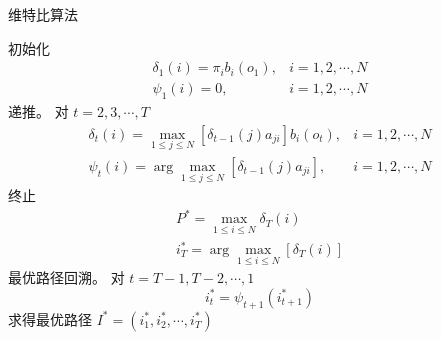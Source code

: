 \begin{algorithm}
\caption{维特比算法}


    初始化
$$
\begin{array}{cc}
\delta_{1}(i)=\pi_{i} b_{i}\left(o_{1}\right), & i=1,2, \cdots, N \\
\psi_{1}(i)=0, & i=1,2, \cdots, N
\end{array}
$$\;
递推。 对 $ t=2,3, \cdots, T $
$$
\begin{array}{ll}
\delta_{t}(i)=\max _{1 \leqslant j \leqslant N}\left[\delta_{t-1}(j) a_{j i}\right] b_{i}\left(o_{t}\right), & i=1,2, \cdots, N \\
\psi_{t}(i)=\arg \max _{1 \leqslant j \leqslant N}\left[\delta_{t-1}(j) a_{j i}\right], & i=1,2, \cdots, N
\end{array}
$$\;
终止
$$
\begin{array}{c}
P^{*}=\max _{1 \leqslant i \leqslant N} \delta_{T}(i) \\
i_{T}^{*}=\arg \max _{1 \leqslant i \leqslant N}\left[\delta_{T}(i)\right]
\end{array}
$$\;
最优路径回溯。 对 $ t=T-1, T-2, \cdots, 1 $
$$
i_{t}^{*}=\psi_{t+1}\left(i_{t+1}^{*}\right)
$$
求得最优路径 $ I^{*}=\left(i_{1}^{*}, i_{2}^{*}, \cdots, i_{T}^{*}\right) $
\;

\end{algorithm}{}